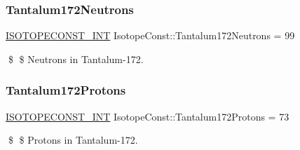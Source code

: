 \subsubsection{\texorpdfstring{Tantalum172\+Neutrons}{Tantalum172Neutrons}}
{\footnotesize\ttfamily \mbox{\hyperlink{group___isotope_const-_macros_ga5f18360b3e99483a35c32d789e62621c}{I\+S\+O\+T\+O\+P\+E\+C\+O\+N\+S\+T\+\_\+\+I\+NT}} Isotope\+Const\+::\+Tantalum172\+Neutrons = 99}

\$ \$ Neutrons in Tantalum-\/172. \mbox{\label{group___isotope_const-_tantalum-_ta172_gaf356fe7dfb07527bd32e665b8d3eae1d}} 
\subsubsection{\texorpdfstring{Tantalum172\+Protons}{Tantalum172Protons}}
{\footnotesize\ttfamily \mbox{\hyperlink{group___isotope_const-_macros_ga5f18360b3e99483a35c32d789e62621c}{I\+S\+O\+T\+O\+P\+E\+C\+O\+N\+S\+T\+\_\+\+I\+NT}} Isotope\+Const\+::\+Tantalum172\+Protons = 73}

\$ \$ Protons in Tantalum-\/172. 